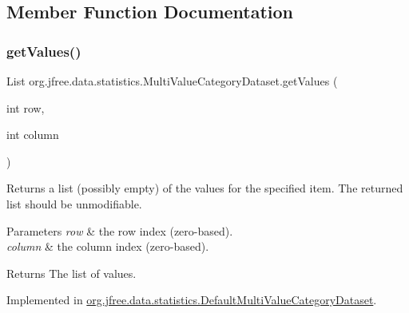 \subsection{Member Function Documentation}
\mbox{\label{interfaceorg_1_1jfree_1_1data_1_1statistics_1_1_multi_value_category_dataset_ad84c58a61b652cdb78a8ed459510fb74}} 
\subsubsection{\texorpdfstring{get\+Values()}{getValues()}\hspace{0.1cm}{\footnotesize\ttfamily [1/2]}}
{\footnotesize\ttfamily List org.\+jfree.\+data.\+statistics.\+Multi\+Value\+Category\+Dataset.\+get\+Values (\begin{DoxyParamCaption}\item[{int}]{row,  }\item[{int}]{column }\end{DoxyParamCaption})}

Returns a list (possibly empty) of the values for the specified item. The returned list should be unmodifiable.


\begin{DoxyParams}{Parameters}
{\em row} & the row index (zero-\/based). \\
\hline
{\em column} & the column index (zero-\/based).\\
\hline
\end{DoxyParams}
\begin{DoxyReturn}{Returns}
The list of values. 
\end{DoxyReturn}


Implemented in \mbox{\hyperlink{classorg_1_1jfree_1_1data_1_1statistics_1_1_default_multi_value_category_dataset_af4ab5f0a4363c4e57bbf17921326bc3e}{org.\+jfree.\+data.\+statistics.\+Default\+Multi\+Value\+Category\+Dataset}}.

\mbox{\label{interfaceorg_1_1jfree_1_1data_1_1statistics_1_1_multi_value_category_dataset_a59a071f5642de62b2f79d3fae9e3fdbf}} 
